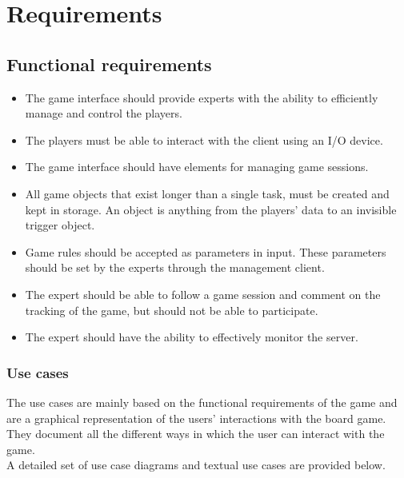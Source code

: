 \section{Requirements}
\subsection{Functional requirements}

\begin{itemize} \setlength{\itemsep}{0cm}\setlength{\parskip}{0cm}
	\item The game interface should provide experts with the ability to efficiently manage and control the players.
	\item The players must be able to interact with the client using an I/O device.
	\item The game interface should have elements for managing game sessions.
	\item All game objects that exist longer than a single task, must be created and kept in storage. An object is anything from the players’ data to an invisible trigger object.
	\item Game rules should be accepted as parameters in input. These parameters should be set by the experts through the management client. 
	\item The expert should be able to follow a game session and comment on the tracking of the game, but should not be able to participate.
	\item The expert should have the ability to effectively monitor the server.
\end{itemize}
\subsubsection{Use cases}
The use cases are mainly based on the functional requirements of the game and are a graphical representation of the users’ interactions with the board game. They document all the different ways in which the user can interact with the game. 
\\
A detailed set of use case diagrams and textual use cases are provided below.\\


